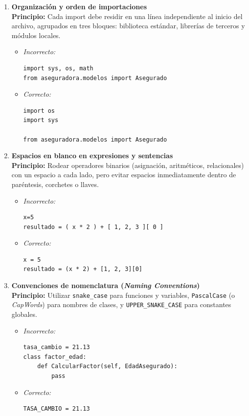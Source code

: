 \documentclass[12pt, letterpaper]{article}
\begin{document}
\begin{enumerate}
\begin{itemize}
\begin{verbatim}
    def es_mayor(self):
        return self.edad >= 18


def funcion_auxiliar():
    pass
\end{verbatim}
    \end{itemize}

    \item \textbf{Organización y orden de importaciones} \\
    \textbf{Principio:} Cada import debe residir en una línea independiente al inicio del archivo, agrupados en tres bloques: biblioteca estándar, librerías de terceros y módulos locales.
    \begin{itemize}
        \item \textit{Incorrecto:}
\begin{verbatim}
import sys, os, math
from aseguradora.modelos import Asegurado
\end{verbatim}
        \item \textit{Correcto:}
\begin{verbatim}
import os
import sys

from aseguradora.modelos import Asegurado
\end{verbatim}
    \end{itemize}

    \item \textbf{Espacios en blanco en expresiones y sentencias} \\
    \textbf{Principio:} Rodear operadores binarios (asignación, aritméticos, relacionales) con un espacio a cada lado, pero evitar espacios inmediatamente dentro de paréntesis, corchetes o llaves.
    \begin{itemize}
        \item \textit{Incorrecto:}
\begin{verbatim}
x=5
resultado = ( x * 2 ) + [ 1, 2, 3 ][ 0 ]
\end{verbatim}
        \item \textit{Correcto:}
\begin{verbatim}
x = 5
resultado = (x * 2) + [1, 2, 3][0]
\end{verbatim}
    \end{itemize}

    \item \textbf{Convenciones de nomenclatura (\textit{Naming Conventions})} \\
    \textbf{Principio:} Utilizar \texttt{snake\_case} para funciones y variables, \texttt{PascalCase} (o \textit{CapWords}) para nombres de clases, y \texttt{UPPER\_SNAKE\_CASE} para constantes globales.
    \begin{itemize}
        \item \textit{Incorrecto:}
\begin{verbatim}
tasa_cambio = 21.13
class factor_edad:
    def CalcularFactor(self, EdadAsegurado):
        pass
\end{verbatim}
        \item \textit{Correcto:}
\begin{verbatim}
TASA_CAMBIO = 21.13


\end{verbatim}
\end{itemize}
\end{enumerate}
\end{document}
